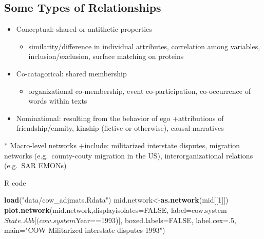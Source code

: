 \documentclass[]{book}
\newenvironment{Shaded}{\begin{snugshade}}{\end{snugshade}}
\newcommand{\KeywordTok}[1]{\textcolor[rgb]{0.13,0.29,0.53}{\textbf{{#1}}}}
\newcommand{\DataTypeTok}[1]{\textcolor[rgb]{0.13,0.29,0.53}{{#1}}}
\newcommand{\DecValTok}[1]{\textcolor[rgb]{0.00,0.00,0.81}{{#1}}}
\newcommand{\StringTok}[1]{\textcolor[rgb]{0.31,0.60,0.02}{{#1}}}
\newcommand{\OtherTok}[1]{\textcolor[rgb]{0.56,0.35,0.01}{{#1}}}
\newcommand{\NormalTok}[1]{{#1}}
\providecommand{\tightlist}{%
  \setlength{\itemsep}{0pt}\setlength{\parskip}{0pt}}
\theoremstyle{definition}
\theoremstyle{definition}
\theoremstyle{definition}
\theoremstyle{remark}
\let\BeginKnitrBlock\begin \let\EndKnitrBlock\end
\begin{document}
\subsection{Some Types of
Relationships}\label{some-types-of-relationships}

\begin{itemize}
\tightlist
\item
  Conceptual: shared or antithetic properties

  \begin{itemize}
  \tightlist
  \item
    similarity/difference in individual attributes, correlation among
    variables, inclusion/exclusion, surface matching on proteins
  \end{itemize}
\item
  Co-catagorical: shared membership

  \begin{itemize}
  \tightlist
  \item
    organizational co-membership, event co-participation, co-occurrence
    of words within texts
  \end{itemize}
\item
  Nominational: resulting from the behavior of ego +attributions of
  friendship/enmity, kinship (fictive or otherwise), causal narratives
\end{itemize}

\BeginKnitrBlock{example}
\protect\hypertarget{exm:unnamed-chunk-19}{}{\label{exm:unnamed-chunk-19} }
* Macro-level networks +include: militarized interstate disputes,
migration networks (e.g.~county-couty migration in the US),
interorganizational relations (e.g.~SAR EMONs)
\EndKnitrBlock{example}

R code

\begin{Shaded}
\begin{Highlighting}[]
\KeywordTok{load}\NormalTok{(}\StringTok{"data/cow_adjmats.Rdata"}\NormalTok{)}
\NormalTok{mid.network<-}\KeywordTok{as.network}\NormalTok{(mid[[}\DecValTok{1}\NormalTok{]])}
\KeywordTok{plot.network}\NormalTok{(mid.network,}\DataTypeTok{displayisolates=}\OtherTok{FALSE}\NormalTok{, }\DataTypeTok{label=}\NormalTok{cow.system$State.Abb[(cow.system$Year==}\DecValTok{1993}\NormalTok{)], }\DataTypeTok{boxed.labels=}\OtherTok{FALSE}\NormalTok{, }\DataTypeTok{label.cex=}\NormalTok{.}\DecValTok{5}\NormalTok{, }\DataTypeTok{main=}\StringTok{"COW Militarized interstate disputes 1993"}\NormalTok{)}
\end{Highlighting}
\end{Shaded}
\end{document}
